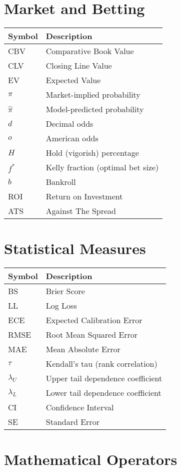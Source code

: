 \section*{Market and Betting}

\begin{tabular}{ll}
\toprule
\textbf{Symbol} & \textbf{Description} \\
\midrule
CBV & Comparative Book Value \\
CLV & Closing Line Value \\
EV & Expected Value \\
$\pi$ & Market-implied probability \\
$\hat{\pi}$ & Model-predicted probability \\
$d$ & Decimal odds \\
$o$ & American odds \\
$H$ & Hold (vigorish) percentage \\
$f^*$ & Kelly fraction (optimal bet size) \\
$b$ & Bankroll \\
ROI & Return on Investment \\
ATS & Against The Spread \\
\bottomrule
\end{tabular}

\section*{Statistical Measures}

\begin{tabular}{ll}
\toprule
\textbf{Symbol} & \textbf{Description} \\
\midrule
BS & Brier Score \\
LL & Log Loss \\
ECE & Expected Calibration Error \\
RMSE & Root Mean Squared Error \\
MAE & Mean Absolute Error \\
$\tau$ & Kendall's tau (rank correlation) \\
$\lambda_U$ & Upper tail dependence coefficient \\
$\lambda_L$ & Lower tail dependence coefficient \\
CI & Confidence Interval \\
SE & Standard Error \\
\bottomrule
\end{tabular}

\section*{Mathematical Operators}

